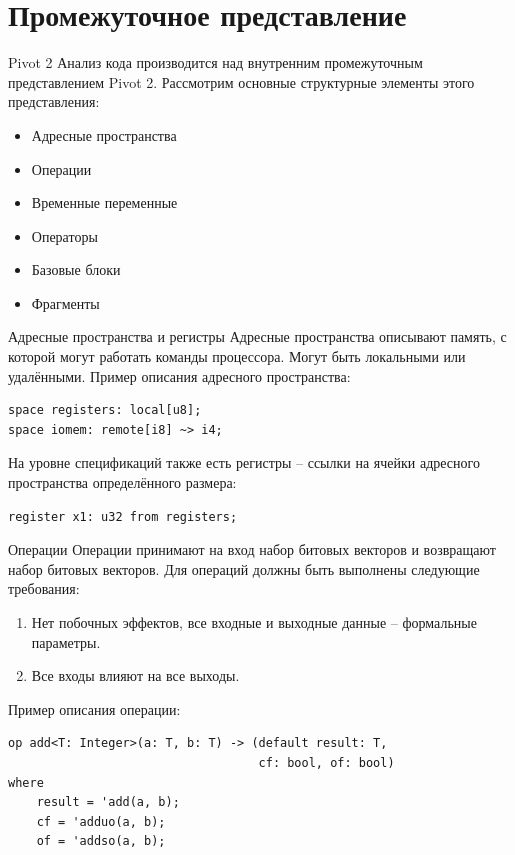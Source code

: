 \documentclass[presentation]{beamer}
\begin{document}
\section{Промежуточное представление}
\label{sec:orgaf84483}
\begin{frame}[label={sec:orgfd4929c}]{Pivot 2}
Анализ кода производится над внутренним промежуточным представлением Pivot 2. Рассмотрим
основные структурные элементы этого представления:
\begin{itemize}
\item Адресные пространства
\item Операции
\item Временные переменные
\item Операторы
\item Базовые блоки
\item Фрагменты
\end{itemize}
\end{frame}
\begin{frame}[label={sec:org23ef167},fragile]{Адресные пространства и регистры}
 Адресные пространства описывают память, с которой могут работать команды процессора. Могут
быть локальными или удалёнными. Пример описания адресного пространства:
\begin{verbatim}
space registers: local[u8];
space iomem: remote[i8] ~> i4;
\end{verbatim}

На уровне спецификаций также есть \alert{регистры} -- ссылки на ячейки адресного пространства
определённого размера:
\begin{verbatim}
register x1: u32 from registers;
\end{verbatim}
\end{frame}
\begin{frame}[label={sec:org4ea4147},fragile]{Операции}
 Операции принимают на вход набор битовых векторов и возвращают набор битовых векторов. Для
операций должны быть выполнены следующие требования:
\begin{enumerate}
\item Нет побочных эффектов, все входные и выходные данные -- формальные параметры.
\item Все входы влияют на все выходы.
\end{enumerate}
Пример описания операции:
\begin{verbatim}
op add<T: Integer>(a: T, b: T) -> (default result: T,
                                   cf: bool, of: bool)
where
    result = 'add(a, b);
    cf = 'adduo(a, b);
    of = 'addso(a, b);
\end{verbatim}
\end{frame}
\end{document}
